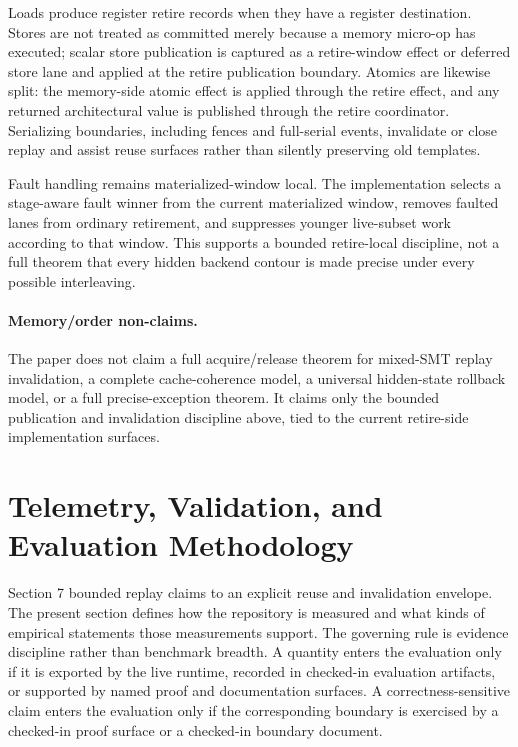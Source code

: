 \documentclass[twocolumn]{article}
\begin{document}
Loads produce register retire records when they have a register destination. Stores are not treated as committed merely because a memory micro-op has executed; scalar store publication is captured as a retire-window effect or deferred store lane and applied at the retire publication boundary. Atomics are likewise split: the memory-side atomic effect is applied through the retire effect, and any returned architectural value is published through the retire coordinator. Serializing boundaries, including fences and full-serial events, invalidate or close replay and assist reuse surfaces rather than silently preserving old templates.

Fault handling remains materialized-window local. The implementation selects a stage-aware fault winner from the current materialized window, removes faulted lanes from ordinary retirement, and suppresses younger live-subset work according to that window. This supports a bounded retire-local discipline, not a full theorem that every hidden backend contour is made precise under every possible interleaving.

\paragraph{Memory/order non-claims.}
The paper does not claim a full acquire/release theorem for mixed-SMT replay invalidation, a complete cache-coherence model, a universal hidden-state rollback model, or a full precise-exception theorem. It claims only the bounded publication and invalidation discipline above, tied to the current retire-side implementation surfaces.


\section{Telemetry, Validation, and Evaluation Methodology}

Section 7 bounded replay claims to an explicit reuse and invalidation envelope. The present section defines how the repository is measured and what kinds of empirical statements those measurements support. The governing rule is evidence discipline rather than benchmark breadth. A quantity enters the evaluation only if it is exported by the live runtime, recorded in checked-in evaluation artifacts, or supported by named proof and documentation surfaces. A correctness-sensitive claim enters the evaluation only if the corresponding boundary is exercised by a checked-in proof surface or a checked-in boundary document.
\end{document}
